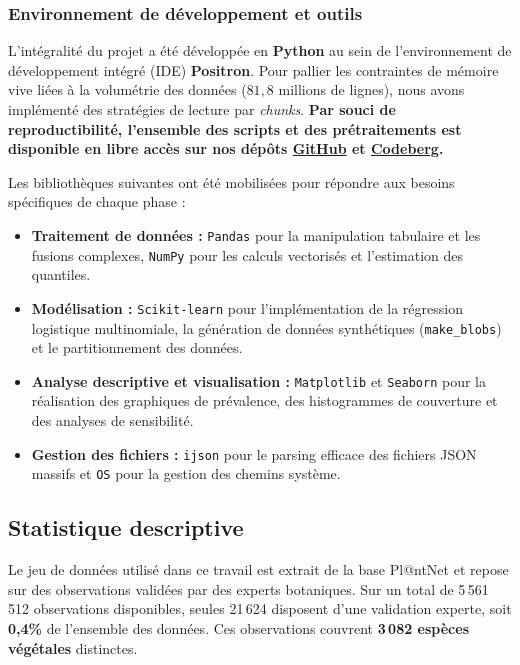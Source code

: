 \documentclass[12pt,a4paper]{article}
\begin{document}
\subsubsection{Environnement de développement et outils}

L’intégralité du projet a été développée en \textbf{Python} au sein de l’environnement de développement intégré (IDE) \textbf{Positron}. Pour pallier les contraintes de mémoire vive liées à la volumétrie des données ($81{,}8$ millions de lignes), nous avons implémenté des stratégies de lecture par \textit{chunks}. \textbf{Par souci de reproductibilité, l'ensemble des scripts et des prétraitements est disponible en libre accès sur nos dépôts \href{https://github.com/Mouss1O/Projet_PlantNet_M1_SSD}{GitHub} et \href{https://codeberg.org/jsalmon/CP_for_PlantNet}{Codeberg}.} 

Les bibliothèques suivantes ont été mobilisées pour répondre aux besoins spécifiques de chaque phase :
\begin{itemize}[nosep] %
    \item \textbf{Traitement de données :} \texttt{Pandas} pour la manipulation tabulaire et les fusions complexes, \texttt{NumPy} pour les calculs vectorisés et l'estimation des quantiles.
    \item \textbf{Modélisation :} \texttt{Scikit-learn} pour l'implémentation de la régression logistique multinomiale, la génération de données synthétiques (\texttt{make\_blobs}) et le partitionnement des données.
    \item \textbf{Analyse descriptive et visualisation :} \texttt{Matplotlib} et \texttt{Seaborn} pour la réalisation des graphiques de prévalence, des histogrammes de couverture et des analyses de sensibilité.
    \item \textbf{Gestion des fichiers :} \texttt{ijson} pour le parsing efficace des fichiers JSON massifs et \texttt{OS} pour la gestion des chemins système.
\end{itemize}
 



\subsection{Statistique descriptive}

Le jeu de données utilisé dans ce travail est extrait de la base Pl@ntNet et repose
sur des observations validées par des experts botaniques. Sur un total de
5\,561\,512 observations disponibles, seules 21\,624 disposent d'une validation
experte, soit \textbf{0,4\%} de l'ensemble des données. Ces observations couvrent
\textbf{3\,082 espèces végétales} distinctes.
\end{document}
